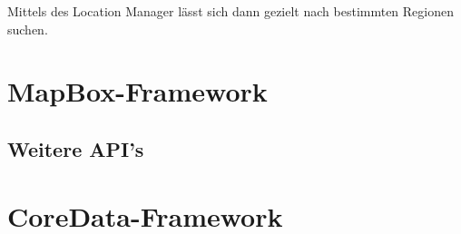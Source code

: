 Mittels des Location Manager lässt sich dann gezielt nach bestimmten Regionen suchen.


\section{MapBox-Framework}
\label{sec:sec:technologies:mapbox}

\subsection{Weitere API's}
\label{sec:technologies:iosandxcode:otherapis}


\section{CoreData-Framework}
\label{sec:technologies:coredata}
